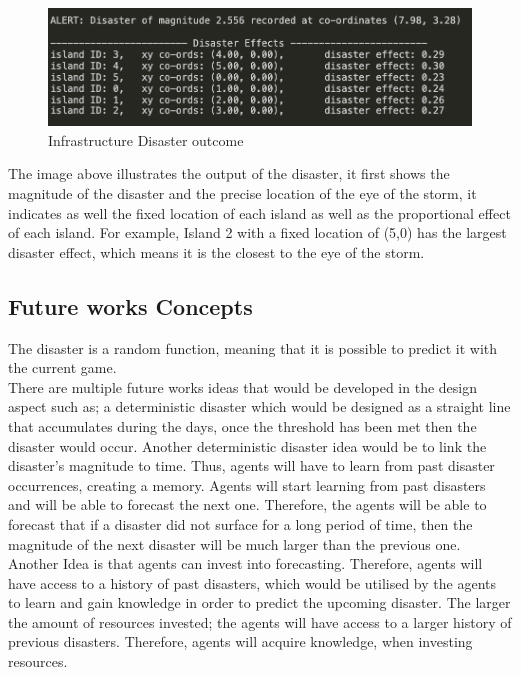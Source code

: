 \begin{figure}[!htb]
    \centering
    \includegraphics[width=1\textwidth]{04_environment/Images/Disaster output infrastructure.png}
    \caption{Infrastructure Disaster outcome}
    \label{Images:Disaster output infrastructure}
\end{figure}

The image above illustrates the output of the disaster, it first shows the magnitude of the disaster and the precise location of the eye of the storm, it indicates as well the fixed location of each island as well as the proportional effect of each island. For example, Island 2 with a fixed location of (5,0) has the largest disaster effect, which means it is the closest to the eye of the storm.\\

\subsection{Future works Concepts}

The disaster is a random function, meaning that it is possible to predict it with the current game.\\

There are multiple future works ideas that would be developed in the design aspect such as; a deterministic disaster which would be  designed as a straight line that accumulates during the days, once the threshold has been met then the disaster would occur. Another deterministic disaster idea would be to link the disaster’s magnitude to time. Thus, agents will have to learn from past disaster occurrences, creating a memory. Agents will start learning from past disasters and will be able to forecast the next one. Therefore, the agents will be able to forecast that if a disaster did not surface for a long period of time, then the magnitude of the next disaster will be much larger than the previous one.\\

Another Idea is that agents can invest into forecasting. Therefore, agents will have access to a history of past disasters, which would be utilised by the agents to learn and gain knowledge in order to predict the upcoming disaster. The larger the amount of resources invested; the agents will have access to a larger history of previous disasters. Therefore, agents will acquire knowledge, when investing resources.\\

